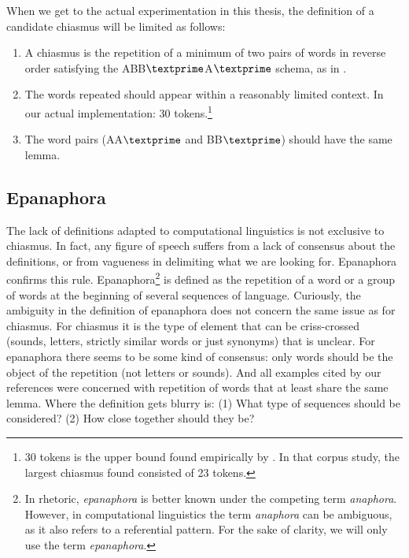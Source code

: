 When we get to the actual experimentation in this thesis, the definition of a candidate chiasmus will be limited as follows:
\bigskip
\begin{enumerate}
\item A chiasmus is the repetition of a minimum of two pairs of words in reverse order satisfying the ABB$\textprime$A$\textprime$ schema, as in .
\item The words repeated should appear within a reasonably limited context. In our actual implementation: 30 tokens.\footnote{30 tokens is the upper bound found empirically by \citet{dubremetz2013}. In that corpus study, the largest chiasmus found consisted of 23 tokens.}
\item The word pairs (AA$\textprime$ and BB$\textprime$) should have the same lemma.
\end{enumerate}



\subsection{Epanaphora}
The lack of definitions adapted to computational linguistics is not exclusive to chiasmus. In fact, any figure of speech suffers from a lack of consensus about the definitions, or from vagueness in delimiting what we are looking for. Epanaphora confirms this rule.
Epanaphora\footnote{In rhetoric, \emph{epanaphora} is better known under the competing term \emph{anaphora}. However, in computational linguistics the term \emph{anaphora} can be ambiguous, as it also refers to a referential pattern. For the sake of clarity, we will only use the term \emph{epanaphora}.}
 is defined as the repetition of a word or a group of words at the beginning of several sequences of language. Curiously, the ambiguity in the definition of epanaphora does not concern the same issue as for chiasmus. For chiasmus it is the type of element that can be criss-crossed (sounds, letters, strictly similar words or just synonyms) that is unclear. For epanaphora there seems to be some kind of consensus: only words should be the object of the repetition (not letters or sounds). And all examples cited by our references were concerned with repetition of words that at least share the same lemma. Where the definition gets blurry is: (1) What type of sequences should be considered? (2) How close together should they be? 

